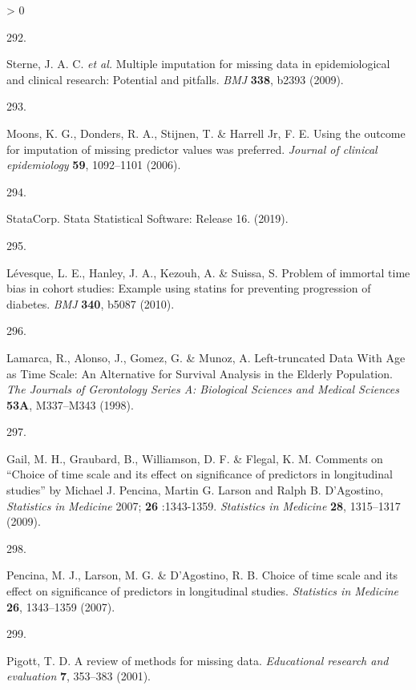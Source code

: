 \documentclass[a4paper, twoside]{templates/ociamthesis}
\newlength{\cslhangindent}
\newlength{\csllabelwidth}
\newenvironment{CSLReferences}[3] %
 {%
  \setlength{\parindent}{0pt}
  \ifodd #1 \everypar{\setlength{\hangindent}{\cslhangindent}}\ignorespaces\fi
  \ifnum #2 > 0
  \setlength{\parskip}{#2\baselineskip}
  \fi
 }%
 {}
\newcommand{\CSLLeftMargin}[1]{\parbox[t]{\maxof{\widthof{#1}}{\csllabelwidth}}{#1}}
\newcommand{\CSLRightInline}[1]{\parbox[t]{\linewidth - \csllabelwidth}{#1}}
\begin{document}
\begin{CSLReferences}{0}{0}
\leavevmode\hypertarget{ref-sterne2009}{}%
\CSLLeftMargin{292. }
\CSLRightInline{Sterne, J. A. C. \emph{et al.} Multiple imputation for missing data in epidemiological and clinical research: Potential and pitfalls. \emph{BMJ} \textbf{338}, b2393 (2009).}

\leavevmode\hypertarget{ref-moons2006}{}%
\CSLLeftMargin{293. }
\CSLRightInline{Moons, K. G., Donders, R. A., Stijnen, T. \& Harrell Jr, F. E. Using the outcome for imputation of missing predictor values was preferred. \emph{Journal of clinical epidemiology} \textbf{59}, 1092--1101 (2006).}

\leavevmode\hypertarget{ref-statacorp2019}{}%
\CSLLeftMargin{294. }
\CSLRightInline{StataCorp. Stata {Statistical Software}: Release 16. (2019).}

\leavevmode\hypertarget{ref-levesque2010}{}%
\CSLLeftMargin{295. }
\CSLRightInline{Lévesque, L. E., Hanley, J. A., Kezouh, A. \& Suissa, S. Problem of immortal time bias in cohort studies: Example using statins for preventing progression of diabetes. \emph{BMJ} \textbf{340}, b5087 (2010).}

\leavevmode\hypertarget{ref-lamarca1998}{}%
\CSLLeftMargin{296. }
\CSLRightInline{Lamarca, R., Alonso, J., Gomez, G. \& Munoz, A. Left-truncated {Data With Age} as {Time Scale}: An {Alternative} for {Survival Analysis} in the {Elderly Population}. \emph{The Journals of Gerontology Series A: Biological Sciences and Medical Sciences} \textbf{53A}, M337--M343 (1998).}

\leavevmode\hypertarget{ref-gail2009}{}%
\CSLLeftMargin{297. }
\CSLRightInline{Gail, M. H., Graubard, B., Williamson, D. F. \& Flegal, K. M. Comments on {``{Choice} of time scale and its effect on significance of predictors in longitudinal studies''} by {Michael J}. {Pencina}, {Martin G}. {Larson} and {Ralph B}. {D}'{Agostino}, {\emph{Statistics}}{ \emph{in} }{\emph{Medicine}} 2007; {\textbf{26}} :1343-1359. \emph{Statistics in Medicine} \textbf{28}, 1315--1317 (2009).}

\leavevmode\hypertarget{ref-pencina2007}{}%
\CSLLeftMargin{298. }
\CSLRightInline{Pencina, M. J., Larson, M. G. \& D'Agostino, R. B. Choice of time scale and its effect on significance of predictors in longitudinal studies. \emph{Statistics in Medicine} \textbf{26}, 1343--1359 (2007).}

\leavevmode\hypertarget{ref-pigott2001}{}%
\CSLLeftMargin{299. }
\CSLRightInline{Pigott, T. D. A review of methods for missing data. \emph{Educational research and evaluation} \textbf{7}, 353--383 (2001).}


\end{CSLReferences}
\end{document}
